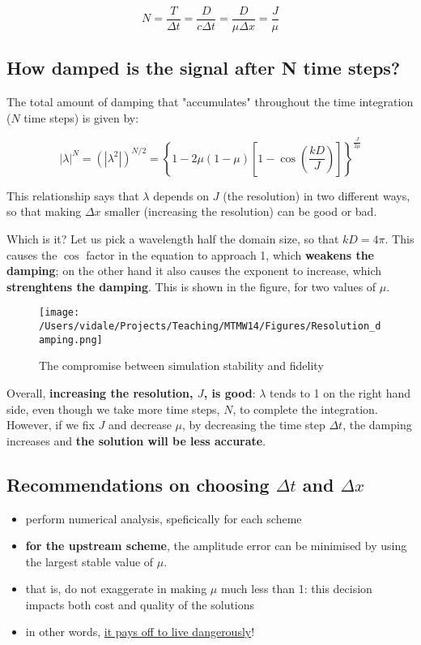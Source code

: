 \begin{equation}
	N= \frac {T}{\Delta t} = \frac {D}{c \Delta t} = \frac {D}{\mu \Delta x} = \frac {J}{\mu}
\end{equation}



\subsection{How damped is the signal after N time steps?}
The total amount of damping that "accumulates" throughout the time integration ($N$ time steps) is given by:

\begin{equation}
	|\lambda|^N=(|\lambda^2|)^{N/2} = \left \{ 1 -2 \mu (1-\mu) \left[ 1 - \cos ( \frac {k D} {J}) \right] \right \} ^{\frac {J}{2 \mu}}
\end{equation}

This relationship says that $\lambda$ depends on $J$ (the resolution) in two different ways, so that making $\Delta x$ smaller (increasing the resolution) can be good or bad. 

\medskip
Which is it?
Let us pick a wavelength half the domain size, so that $kD=4 \pi$. This causes the $\cos$ factor in the equation to approach 1, which \textbf{weakens the damping}; on the other hand it also causes the exponent to increase, which \textbf{strenghtens the damping}. This is shown in the figure, for two values of $\mu$.

	\begin{figure}[h!]
		\texttt{[image: /Users/vidale/Projects/Teaching/MTMW14/Figures/Resolution\_damping.png]}
		\caption{The compromise between simulation stability and fidelity}
	\end{figure}

	Overall, \textbf{increasing the resolution, $J$, is good}: $\lambda$ tends to 1 on the right hand side, even though we take more time steps, $N$, to complete the integration. However, if we fix $J$ and decrease $\mu$, by decreasing the time step $\Delta t$, the damping increases and \textbf{the solution will be less accurate}. 

\subsection{Recommendations on choosing $\Delta t$ and $\Delta x $}

	\begin{itemize}
		\item perform numerical analysis, speficically for each scheme
		\item \textbf{for the upstream scheme}, the amplitude error can be minimised by using the largest stable value of $\mu$.
		\item that is, do not exaggerate in making $\mu$ much less than 1: this decision impacts both cost and quality of the solutions
		\item in other words, \underline{it pays off to live dangerously}!
	\end{itemize}

